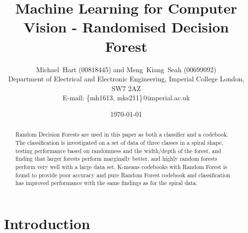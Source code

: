 \documentclass[a4paper, 10pt, conference]{ieeeconf}
\begin{document}
\title{Machine Learning for Computer Vision - Randomised Decision Forest}
\author{Michael~Hart (00818445) and
        Meng~Kiang~Seah (00699092)
\\
        Department of Electrical and Electronic Engineering,
        Imperial College London,
        SW7 2AZ
\\
        E-mail: \{mh1613, mks211\}@imperial.ac.uk}
\date{\today}




\maketitle


\begin{abstract}

Random Decision Forests are used in this paper as both a classifier and a codebook. The classification is investigated on a set of data of three classes in a spiral shape, testing performance based on randomness and the width/depth of the forest, and finding that larger forests perform marginally better, and highly random forests perform very well with a large data set. K-means codebooks with Random Forest is found to provide poor accuracy and pure Random Forest codebook and classification has improved performance with the same findings as for the spiral data.

\end{abstract}

\section{Introduction}
\end{document}
